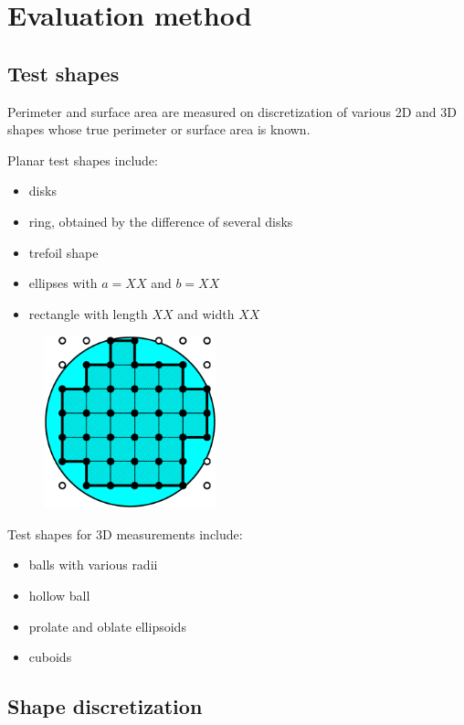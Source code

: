 \documentclass{InsightArticle}
\begin{document}
\section{Evaluation method}

\subsection{Test shapes}

Perimeter and surface area are measured on discretization of various 2D and 3D shapes 
whose true perimeter or surface area is known.

Planar test shapes include:
\begin{itemize}
\item disks
\item ring, obtained by the difference of several disks
\item trefoil shape
\item ellipses with $a=XX$ and $b=XX$
\item rectangle with length $XX$ and width $XX$
\end{itemize}

\begin{figure}[!htb]
\begin{center}
\includegraphics[width=5cm]{images/discreteDisk}
\end{center}
\end{figure}

Test shapes for 3D measurements include:
\begin{itemize}
\item balls with various radii
\item hollow ball
\item prolate and oblate ellipsoids
\item cuboids
\end{itemize}

\subsection{Shape discretization}
\end{document}
